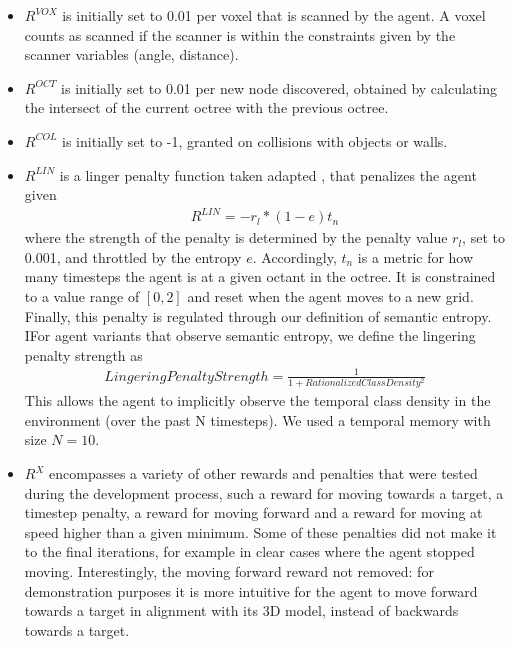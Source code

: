 \begin{itemize}
    \item $R^{VOX}$ is initially set to 0.01 per voxel that is scanned by the agent. A voxel counts as scanned if the scanner is within the constraints given by the scanner variables (angle, distance).
    \item $R^{OCT}$ is initially set to 0.01 per new node discovered, obtained by calculating the intersect of the current octree with the previous octree.
    \item $R^{COL}$ is initially set to -1, granted on collisions with objects or walls.
    \item $R^{LIN}$ is a linger penalty function taken adapted \cite{github-mbaske-explorer-drone}, that penalizes the agent given 
        \begin{gather}
        R^{LIN} = -r_l * (1-e) t_n \label{eu_penalty_linger}
        \end{gather}
    where 
    the strength of the penalty is determined by the penalty value $r_l$, set to 0.001, and throttled by the entropy $e$. %
    Accordingly, $t_n$ is a metric for how many timesteps the agent is at a given octant in the octree. It is constrained to a value range of $[0,2]$ and 
    reset when the agent moves to a new grid. 
    Finally, this penalty is regulated through our definition of semantic entropy. IFor agent variants that observe semantic entropy, we define the lingering penalty strength as 
    \begin{gather}
        LingeringPenaltyStrength = \frac{1}{1 + RationalizedClassDensity^2} \label{eu_lingeringpenaltystrength}
    \end{gather}
    This allows the agent to implicitly observe the temporal class density in the environment (over the past N timesteps). We used a temporal memory with size $N = 10$. 

     
    \item $R^{X}$ encompasses a variety of other rewards and penalties that were tested during the development process, such a reward for moving towards a target, a timestep penalty, a reward for moving forward and a reward for moving at speed higher than a given minimum. Some of these penalties did not make it to the final iterations, for example in clear cases where the agent stopped moving. Interestingly, the moving forward reward not removed: for demonstration purposes it is more intuitive for the agent to move forward towards a target in alignment with its 3D model, instead of backwards towards a target.
\end{itemize}

